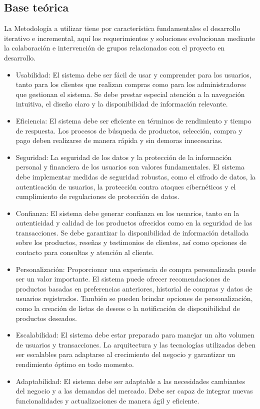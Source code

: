 \documentclass[12pt,a4paper]{article}
\newcommand{\newsubsection}[1]{\subsection{\hspace{4mm} #1}}
\begin{document}
\newsubsection{Base teórica}
La Metodología a utilizar tiene por característica fundamentales el desarrollo iterativo e incremental, aquí los requerimientos y soluciones evolucionan mediante la colaboración e intervención de grupos relacionados con el proyecto en desarrollo.
\begin{itemize}
    \item Usabilidad: El sistema debe ser fácil de usar y comprender para los usuarios, tanto para los clientes que realizan compras como para los administradores que gestionan el sistema. Se debe prestar especial atención a la navegación intuitiva, el diseño claro y la disponibilidad de información relevante.
    \item Eficiencia: El sistema debe ser eficiente en términos de rendimiento y tiempo de respuesta. Los procesos de búsqueda de productos, selección, compra y pago deben realizarse de manera rápida y sin demoras innecesarias.
    \item Seguridad: La seguridad de los datos y la protección de la información personal y financiera de los usuarios son valores fundamentales. El sistema debe implementar medidas de seguridad robustas, como el cifrado de datos, la autenticación de usuarios, la protección contra ataques cibernéticos y el cumplimiento de regulaciones de protección de datos.
    \item Confianza: El sistema debe generar confianza en los usuarios, tanto en la autenticidad y calidad de los productos ofrecidos como en la seguridad de las transacciones. Se debe garantizar la disponibilidad de información detallada sobre los productos, reseñas y testimonios de clientes, así como opciones de contacto para consultas y atención al cliente.
    \item Personalización: Proporcionar una experiencia de compra personalizada puede ser un valor importante. El sistema puede ofrecer recomendaciones de productos basadas en preferencias anteriores, historial de compras y datos de usuarios registrados. También se pueden brindar opciones de personalización, como la creación de listas de deseos o la notificación de disponibilidad de productos deseados.
    \item Escalabilidad: El sistema debe estar preparado para manejar un alto volumen de usuarios y transacciones. La arquitectura y las tecnologías utilizadas deben ser escalables para adaptarse al crecimiento del negocio y garantizar un rendimiento óptimo en todo momento.
    \item Adaptabilidad: El sistema debe ser adaptable a las necesidades cambiantes del negocio y a las demandas del mercado. Debe ser capaz de integrar nuevas funcionalidades y actualizaciones de manera ágil y eficiente.
\end{itemize}
\end{document}
